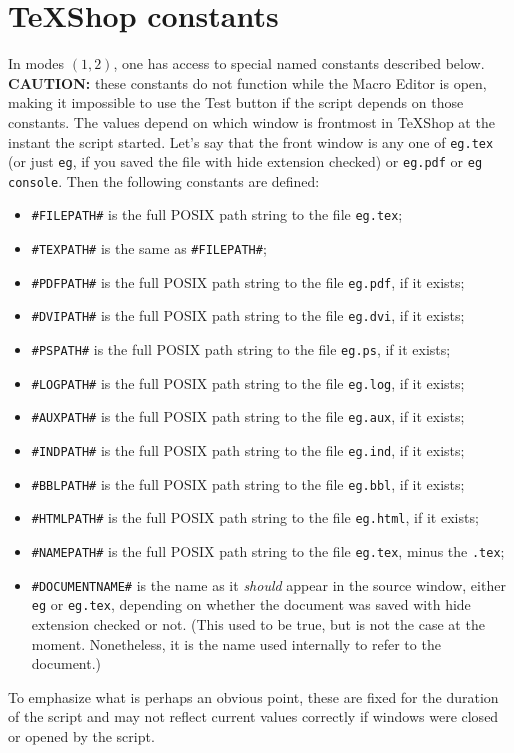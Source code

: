 \documentclass[11pt]{amsart}
\begin{document}
\section{TeXShop constants} %
In modes $(1,2)$, one has access to special named constants described below. \textbf{CAUTION:} these constants do not function while the Macro Editor is open, making it impossible to use the \textsf{Test} button if the script depends on those constants. The values depend on which window is frontmost in TeXShop at the instant the script started. Let's say that the front window is any one of {\tt eg.tex} (or just {\tt eg}, if you saved the file with \textsf{hide extension} checked) or {\tt eg.pdf} or {\tt eg console}. Then the following constants are defined:
\begin{itemize}
\item
\verb|#FILEPATH#| is the full POSIX path string to the file {\tt eg.tex};
\item
\verb|#TEXPATH#| is the same as \verb|#FILEPATH#|;
\item
\verb|#PDFPATH#| is the full POSIX path string to the file {\tt eg.pdf}, if it exists;
\item
\verb|#DVIPATH#| is the full POSIX path string to the file {\tt eg.dvi}, if it exists;
\item
\verb|#PSPATH#| is the full POSIX path string to the file {\tt eg.ps}, if it exists;
\item
\verb|#LOGPATH#| is the full POSIX path string to the file {\tt eg.log}, if it exists;
\item
\verb|#AUXPATH#| is the full POSIX path string to the file {\tt eg.aux}, if it exists;
\item
\verb|#INDPATH#| is the full POSIX path string to the file {\tt eg.ind}, if it exists;
\item
\verb|#BBLPATH#| is the full POSIX path string to the file {\tt eg.bbl}, if it exists;
\item
\verb|#HTMLPATH#| is the full POSIX path string to the file {\tt eg.html}, if it exists;
\item
\verb|#NAMEPATH#| is the full POSIX path string to the file {\tt eg.tex}, minus the {\tt.tex};
\item
\verb|#DOCUMENTNAME#| is the name as it \emph{should} appear in the source window, either {\tt eg} or {\tt eg.tex}, depending on whether the document was saved with \textsf{hide extension} checked or not. (This used to be true, but is not the case at the moment. Nonetheless, it is the name used internally to refer to the document.)
\end{itemize}
To emphasize what is perhaps an obvious point, these are fixed for the duration of the script and may not reflect current values correctly if windows were closed or opened by the script. 
\end{document}
